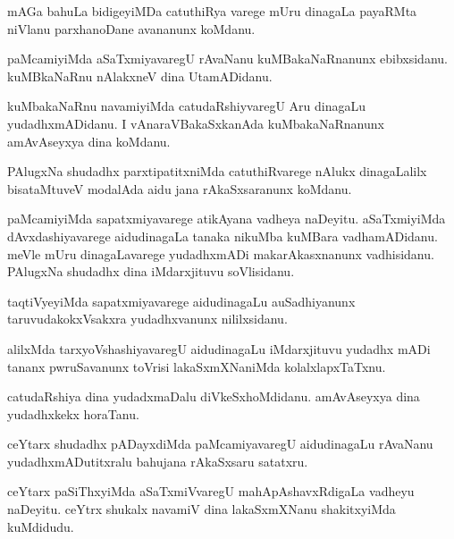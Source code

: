 \documentclass{article}
\begin{document}
\begin{mn}%
mAGa bahuLa bidigeyiMDa catuthiRya varege mUru dinagaLa payaRMta niVlanu parxhanoDane 
avananunx koMdanu.
\end{mn}

\begin{mn}%
paMcamiyiMda aSaTxmiyavaregU rAvaNanu kuMBakaNaRnanunx ebibxsidanu. kuMBkaNaRnu nAlakxneV 
dina UtamADidanu.
\end{mn}

\begin{mn}%
kuMbakaNaRnu navamiyiMda catudaRshiyvaregU Aru dinagaLu yudadhxmADidanu. I 
vAnaraVBakaSxkanAda kuMbakaNaRnanunx amAvAseyxya dina koMdanu. 
\end{mn}

\begin{mn}%
PAlugxNa shudadhx parxtipatitxniMda catuthiRvarege nAlukx dinagaLalilx bisataMtuveV 
modalAda aidu jana rAkaSxsaranunx koMdanu.
\end{mn}

\begin{mn}%
paMcamiyiMda sapatxmiyavarege atikAyana vadheya naDeyitu. aSaTxmiyiMda dAvxdashiyavarege 
aidudinagaLa tanaka nikuMba kuMBara vadhamADidanu. meVle mUru dinagaLavarege yudadhxmADi 
makarAkasxnanunx vadhisidanu. PAlugxNa shudadhx dina iMdarxjituvu soVlisidanu.
\end{mn}

\begin{mn}%
taqtiVyeyiMda sapatxmiyavarege aidudinagaLu auSadhiyanunx taruvudakokxVsakxra 
yudadhxvanunx nililxsidanu.
\end{mn}

\begin{mn}%
alilxMda tarxyoVshashiyavaregU aidudinagaLu iMdarxjituvu yudadhx mADi tananx pwruSavanunx 
toVrisi lakaSxmXNaniMda kolalxlapxTaTxnu.
\end{mn}

\begin{mn}%
catudaRshiya dina yudadxmaDalu diVkeSxhoMdidanu. amAvAseyxya dina yudadhxkekx horaTanu.
\end{mn}

\begin{mn}%
ceYtarx shudadhx pADayxdiMda paMcamiyavaregU aidudinagaLu rAvaNanu yudadhxmADutitxralu 
bahujana rAkaSxsaru satatxru.
\end{mn}

\begin{mn}%
ceYtarx paSiThxyiMda aSaTxmiVvaregU mahApAshavxRdigaLa vadheyu naDeyitu. ceYtrx shukalx 
navamiV dina lakaSxmXNanu shakitxyiMda kuMdidudu.
\end{mn}
\end{document}
